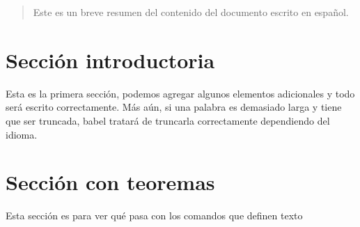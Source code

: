 \documentclass{article}
\begin{document}
 
\tableofcontents
 
\vspace{2cm} %
 
\begin{abstract}
Este es un breve resumen del contenido del 
documento escrito en español.
\end{abstract}
 
\section{Sección introductoria}
Esta es la primera sección, podemos agregar 
algunos elementos adicionales y todo será 
escrito correctamente. Más aún, si una palabra 
es demasiado larga y tiene que ser truncada, 
babel tratará de truncarla correctamente 
dependiendo del idioma.
 
\section{Sección con teoremas}
Esta sección es para ver qué pasa con los comandos 
que definen texto
 
\end{document}
